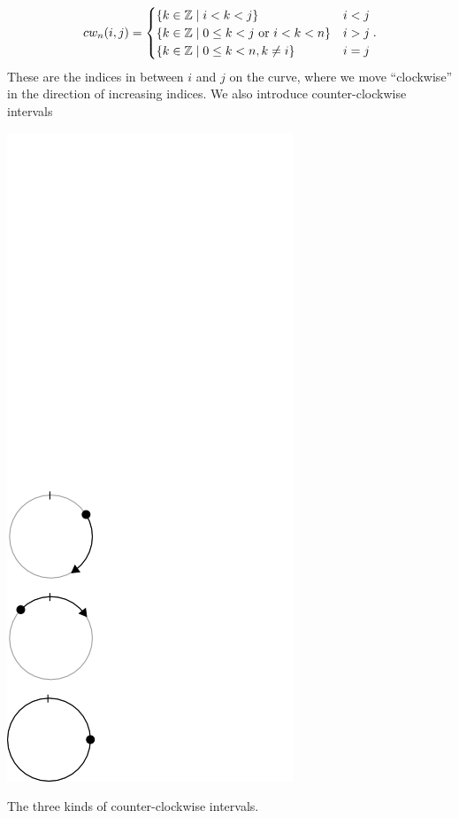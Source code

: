 $$cw_n(i,j) = 
\begin{cases}
\{k \in {\mathbb Z} \mid i < k < j\} & i < j \\
\{k \in {\mathbb Z} \mid 0 \le k < j \mbox{ or } i < k < n \} & i > j \\
\{k \in {\mathbb Z} \mid 0\le k < n, k\ne i \} & i = j\\
\end{cases}.$$
These are the indices in between $i$ and $j$ on the curve, where we
move ``clockwise'' in the direction of increasing indices.  We also
introduce counter-clockwise intervals
\begin{marginfigure}
\includegraphics[width=\linewidth]{figures/circular_intervals/cw.png}
\caption{The three kinds of counter-clockwise intervals.}
\end{marginfigure}
